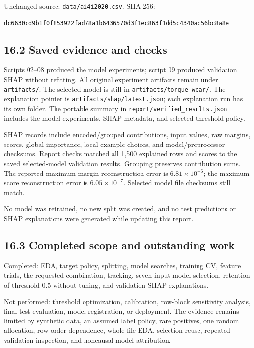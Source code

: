 \documentclass[11pt,a4paper]{article}
\newcommand{\filepath}[1]{\nolinkurl{#1}}
\begin{document}
Unchanged source: \filepath{data/ai4i2020.csv}. SHA-256:
\begin{verbatim}
dc6630cd9b1f0f853922fad78a1b6436570d3f1ec863f1dd5c4340ac56bc8a8e
\end{verbatim}

\subsection*{16.2 Saved evidence and checks}
Scripts 02--08 produced the model experiments; script 09 produced validation
SHAP without refitting. All original experiment artifacts remain under
\filepath{artifacts/}. The selected model is still in
\filepath{artifacts/torque_wear/}. The explanation pointer is
\filepath{artifacts/shap/latest.json}; each explanation run has its own folder.
The portable summary in \filepath{report/verified_results.json} includes the
model experiments, SHAP metadata, and selected threshold policy.

SHAP records include encoded/grouped contributions, input values, raw margins,
scores, global importance, local-example choices, and model/preprocessor
checksums. Report checks matched all 1,500 explained rows and scores to the
saved selected-model validation results. Grouping preserves contribution sums.
The reported maximum margin reconstruction error is
\(6.81\times10^{-6}\); the maximum score reconstruction error is
\(6.05\times10^{-7}\). Selected model file checksums still match.

No model was retrained, no new split was created, and no test predictions
or SHAP explanations were generated while updating this report.

\subsection*{16.3 Completed scope and outstanding work}
Completed: EDA, target policy, splitting, model searches, training CV, feature
trials, the requested combination, tracking, seven-input model selection,
retention of threshold 0.5 without tuning, and validation SHAP explanations.

Not performed: threshold optimization, calibration, row-block sensitivity
analysis, final test evaluation, model registration, or deployment.
The evidence remains limited by synthetic data, an assumed label policy,
rare positives, one random allocation, row-order dependence, whole-file EDA,
selection reuse, repeated validation inspection, and noncausal model attribution.
\endgroup
\end{document}
